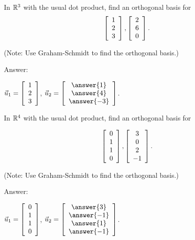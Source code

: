 \documentclass{ximera}
\author{Zack Reed}
\begin{document}
\begin{problem}\label{ex:orthogonal-basis-r3}
  In $\R^3$ with the usual dot product, find an orthogonal basis for
  $$\startmat{c} 1 \\ 2 \\ 3 \stopmat,\startmat{c} 2 \\ 6 \\ 0 \stopmat
    .$$

    (Note: Use Graham-Schmidt to find the orthogonal basis.)
 

  Answer:
  
    $\vect{u}_1 = \startmat{c} 1 \\ 2 \\ 3 \stopmat$,
    $\vect{u}_2 = \startmat{c} \answer{1} \\ \answer{4} \\ \answer{-3} \stopmat$.

\end{problem}

\begin{problem}
  In $\R^4$ with the usual dot product, find an orthogonal basis for

  $$\startmat{c} 0 \\ 1 \\ 1 \\ 0 \stopmat,\startmat{c} 3 \\ 0 \\ 2 \\ -1 \stopmat
    .$$

  (Note: Use Graham-Schmidt to find the orthogonal basis.)

  Answer:

    $\vect{u}_1 = \startmat{c} 0 \\ 1 \\ 1 \\ 0 \stopmat$,
    $\vect{u}_2 = \startmat{c} \answer{3} \\ \answer{-1} \\ \answer{1} \\ \answer{-1} \stopmat$.

\end{problem}
\end{document}
